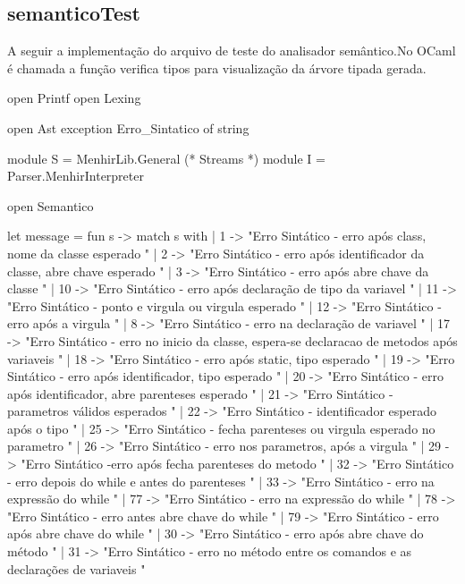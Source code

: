 \documentclass[12pt,a4paper,twoside]{report}
\begin{document}
\subsection{semanticoTest}
A seguir a implementação do arquivo de teste do analisador semântico.No OCaml é chamada a função verifica tipos para visualização da árvore tipada  gerada.
\begin{terminal}open Printf
open Lexing

open Ast
exception Erro_Sintatico of string

module S = MenhirLib.General (* Streams *)
module I = Parser.MenhirInterpreter

open Semantico

let message =
  fun s ->
    match s with
    | 1 ->
        "Erro Sintático - erro após class, nome da classe esperado \n"
    | 2 ->
        "Erro Sintático  - erro após identificador da classe, abre chave esperado \n"
    | 3 ->
        "Erro Sintático - erro após abre chave da classe \n"
    | 10 ->
        "Erro Sintático - erro após declaração de tipo da variavel \n"
    | 11 ->
        "Erro Sintático - ponto e virgula ou virgula esperado \n"
    | 12 ->
        "Erro Sintático - erro após a virgula \n"
    | 8 ->
        "Erro Sintático - erro na declaração de variavel \n"
    | 17 ->
        "Erro Sintático - erro no inicio da classe, espera-se declaracao de metodos após variaveis \n"
    | 18 ->
        "Erro Sintático - erro após static, tipo esperado \n"
    | 19 ->
        "Erro Sintático - erro após identificador, tipo esperado \n"
    | 20 ->
        "Erro Sintático - erro após identificador, abre parenteses esperado \n"
    | 21 ->
        "Erro Sintático - parametros válidos esperados \n"
    | 22 ->
        "Erro Sintático - identificador esperado após o tipo \n"
    | 25 ->
        "Erro Sintático - fecha parenteses ou virgula esperado no parametro \n"
    | 26 ->
        "Erro Sintático - erro nos parametros, após a virgula \n"
    | 29 ->
        "Erro Sintático -erro após fecha parenteses do metodo \n"
    | 32 ->
        "Erro Sintático - erro depois do while e antes do parenteses \n"
    | 33 ->
        "Erro Sintático - erro na expressão do while  \n"
    | 77 ->
        "Erro Sintático - erro na expressão do while  \n"
    | 78 ->
        "Erro Sintático - erro antes abre chave do while  \n"
    | 79 ->
        "Erro Sintático - erro após abre chave do while  \n"
    | 30 ->
        "Erro Sintático - erro após abre chave do método \n"
    | 31 ->
        "Erro Sintático - erro no método entre os comandos e as declarações de variaveis  \n"

\end{terminal}
\end{document}

